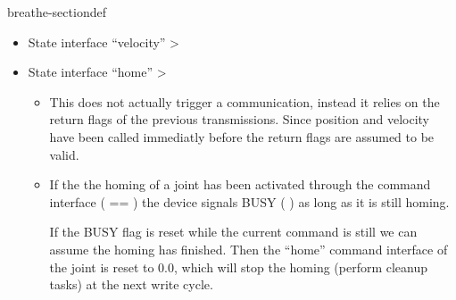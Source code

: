 \documentclass[letterpaper,10pt,english]{sphinxmanual}
\begin{document}
\begin{fulllineitems}
\begin{sphinxuseclass}{breathe-sectiondef}
\begin{fulllineitems}
\begin{itemize}
\item {} 
\sphinxAtStartPar
State interface “velocity” \sphinxhyphen{}\textgreater{} {\hyperref[\detokenize{code/bioscara_hardware_drivers/index:classbioscara__hardware__drivers_1_1Joint_1a12e554163eb7cb23f6b5b07da4b8705a}]{}}

\item {} 
\sphinxAtStartPar
State interface “home” \sphinxhyphen{}\textgreater{} {\hyperref[\detokenize{code/bioscara_hardware_drivers/index:classbioscara__hardware__drivers_1_1BaseJoint_1ad010a69043a9ee4578cadeebc85d9c80}]{}}\begin{itemize}
\item {} 
\sphinxAtStartPar
This does not actually trigger a communication, instead it relies on the return flags of the previous transmissions. Since position and velocity have been called immediatly before the return flags are assumed to be valid.

\item {} 
\sphinxAtStartPar
If the the homing of a joint has been activated through the command interface ({\hyperref[\detokenize{code/bioscara_hardware_drivers/index:classbioscara__hardware__drivers_1_1BaseJoint_1a412c4e474be5de0820d88b7d1d6084de}]{}} == {\hyperref[\detokenize{code/bioscara_hardware_drivers/index:classbioscara__hardware__drivers_1_1BaseJoint_1affbc9ba6c17b02af32647dc76796de13a93a9a074f04be4b2316dbbca5882b6fa}]{}}) the device signals BUSY ({\hyperref[\detokenize{code/bioscara_hardware_drivers/index:classbioscara__hardware__drivers_1_1BaseJoint_1a3d59aa860f6b64e6fead60919386f518}]{}}
\sphinxAtStartPar
) as long as it is still homing.

\sphinxAtStartPar
If the BUSY flag is reset while the current command is still
{\hyperref[\detokenize{code/bioscara_hardware_drivers/index:classbioscara__hardware__drivers_1_1BaseJoint_1affbc9ba6c17b02af32647dc76796de13a93a9a074f04be4b2316dbbca5882b6fa}]{}} we can assume the homing has finished. Then the “home” command interface of the joint is reset to 0.0, which will stop the homing (perform cleanup tasks) at the next write cycle.


\end{itemize}
\end{itemize}
\end{fulllineitems}
\end{sphinxuseclass}
\end{fulllineitems}
\end{document}
